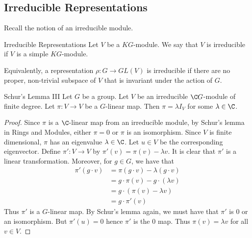 \documentclass[a4paper]{article}
\begin{document}
\subsection{Irreducible Representations}
Recall the notion of an irreducible module. 

\begin{defn}{Irreducible Representations}{} Let $V$ be a $KG$-module. We say that $V$ is irreducible if $V$ is a simple $KG$-module. 
\end{defn}

Equivalently, a representation $\rho:G\to GL(V)$ is irreducible if there are no proper, non-trivial subspace of $V$ that is invariant under the action of $G$. 

\begin{thm}{Schur's Lemma III}{} Let $G$ be a group. Let $V$ be an irreducible $\C G$-module of finite degree. Let $\pi:V\to V$ be a $G$-linear map. Then $\pi=\lambda I_V$ for some $\lambda\in\C$. \tcbline
\begin{proof}
Since $\pi$ is a $\C$-linear map from an irreducible module, by Schur's lemma in Rings and Modules, either $\pi=0$ or $\pi$ is an isomorphism. Since $V$ is finite dimensional, $\pi$ has an eigenvalue $\lambda\in\C$. Let $u\in V$ be the corresponding eigenvector. Define $\pi':V\to V$ by $\pi'(v)=\pi(v)-\lambda v$. It is clear that $\pi'$ is a linear transformation. Moreover, for $g\in G$, we have that 
\begin{align*}
\pi'(g\cdot v)&=\pi(g\cdot v)-\lambda(g\cdot v)\\
&=g\cdot\pi(v)-g\cdot(\lambda v)\\
&=g\cdot(\pi(v)-\lambda v)\\
&=g\cdot\pi'(v)
\end{align*}
Thus $\pi'$ is a $G$-linear map. By Schur's lemma again, we must have that $\pi'$ is $0$ or an isomorphism. But $\pi'(u)=0$ hence $\pi'$ is the $0$ map. Thus $\pi(v)=\lambda v$ for all $v\in V$. 
\end{proof}
\end{thm}
\end{document}
